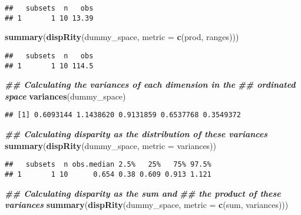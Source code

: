 \documentclass[
]{book}
\newenvironment{Shaded}{\begin{snugshade}}{\end{snugshade}}
\newcommand{\AttributeTok}[1]{\textcolor[rgb]{0.13,0.29,0.53}{#1}}
\newcommand{\DocumentationTok}[1]{\textcolor[rgb]{0.56,0.35,0.01}{\textbf{\textit{#1}}}}
\newcommand{\FunctionTok}[1]{\textcolor[rgb]{0.13,0.29,0.53}{\textbf{#1}}}
\newcommand{\NormalTok}[1]{#1}
\begin{document}
\begin{verbatim}
##   subsets  n   obs
## 1       1 10 13.39
\end{verbatim}

\begin{Shaded}
\begin{Highlighting}[]
\FunctionTok{summary}\NormalTok{(}\FunctionTok{dispRity}\NormalTok{(dummy\_space, }\AttributeTok{metric =} \FunctionTok{c}\NormalTok{(prod, ranges)))}
\end{Highlighting}
\end{Shaded}

\begin{verbatim}
##   subsets  n   obs
## 1       1 10 114.5
\end{verbatim}

\begin{Shaded}
\begin{Highlighting}[]
\DocumentationTok{\#\# Calculating the variances of each dimension in the}
\DocumentationTok{\#\# ordinated space}
\FunctionTok{variances}\NormalTok{(dummy\_space)}
\end{Highlighting}
\end{Shaded}

\begin{verbatim}
## [1] 0.6093144 1.1438620 0.9131859 0.6537768 0.3549372
\end{verbatim}

\begin{Shaded}
\begin{Highlighting}[]
\DocumentationTok{\#\# Calculating disparity as the distribution of these variances}
\FunctionTok{summary}\NormalTok{(}\FunctionTok{dispRity}\NormalTok{(dummy\_space, }\AttributeTok{metric =}\NormalTok{ variances))}
\end{Highlighting}
\end{Shaded}

\begin{verbatim}
##   subsets  n obs.median 2.5%   25%   75% 97.5%
## 1       1 10      0.654 0.38 0.609 0.913 1.121
\end{verbatim}

\begin{Shaded}
\begin{Highlighting}[]
\DocumentationTok{\#\# Calculating disparity as the sum and}
\DocumentationTok{\#\# the product of these variances}
\FunctionTok{summary}\NormalTok{(}\FunctionTok{dispRity}\NormalTok{(dummy\_space, }\AttributeTok{metric =} \FunctionTok{c}\NormalTok{(sum, variances)))}
\end{Highlighting}
\end{Shaded}
\end{document}
